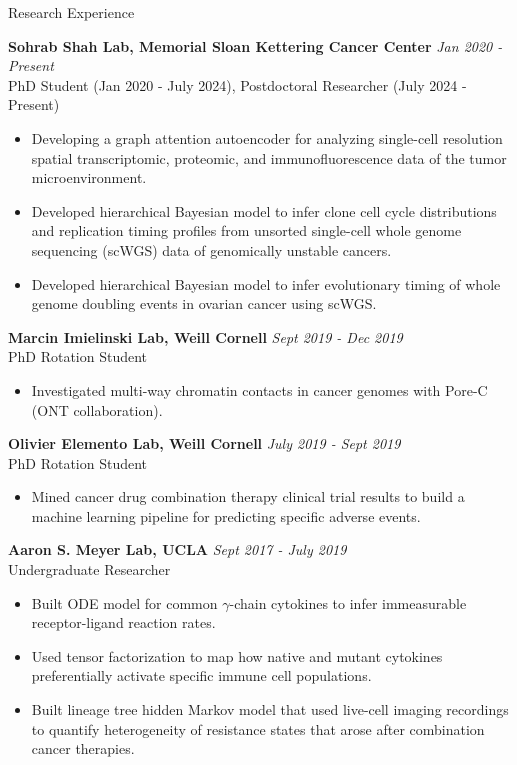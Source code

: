 \documentclass{resume} %
\begin{document}
\begin{rSection}{Research Experience}

{\bf Sohrab Shah Lab, Memorial Sloan Kettering Cancer Center} \hfill {\em Jan 2020 - Present} \\
PhD Student (Jan 2020 - July 2024), Postdoctoral Researcher (July 2024 - Present)
\begin{itemize}
  \item Developing a graph attention autoencoder for analyzing single-cell resolution spatial transcriptomic, proteomic, and immunofluorescence data of the tumor microenvironment.
  \item Developed hierarchical Bayesian model to infer clone cell cycle distributions and replication timing profiles from unsorted single-cell whole genome sequencing (scWGS) data of genomically unstable cancers.
  \item Developed hierarchical Bayesian model to infer evolutionary timing of whole genome doubling events in ovarian cancer using scWGS.
\end{itemize}

{\bf Marcin Imielinski Lab, Weill Cornell} \hfill {\em Sept 2019 - Dec 2019} \\
PhD Rotation Student
\begin{itemize}
  \item Investigated multi-way chromatin contacts in cancer genomes with Pore-C (ONT collaboration).
\end{itemize}

{\bf Olivier Elemento Lab, Weill Cornell} \hfill {\em July 2019 - Sept 2019} \\
PhD Rotation Student
\begin{itemize}
  \item Mined cancer drug combination therapy clinical trial results to build a machine learning pipeline for predicting specific adverse events.
\end{itemize}

{\bf Aaron S. Meyer Lab, UCLA} \hfill {\em Sept 2017 - July 2019} \\
Undergraduate Researcher
\begin{itemize}
  \item Built ODE model for common $\gamma$-chain cytokines to infer immeasurable receptor-ligand reaction rates.
  \item Used tensor factorization to map how native and mutant cytokines preferentially activate specific immune cell populations.
  \item Built lineage tree hidden Markov model that used live-cell imaging recordings to quantify heterogeneity of resistance states that arose after combination cancer therapies.
\end{itemize}


\end{rSection}
\end{document}
